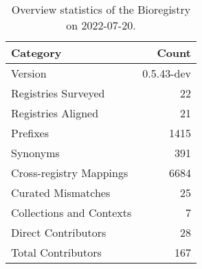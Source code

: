 \begin{table}
\centering
\caption{Overview statistics of the Bioregistry on 2022-07-20.}
\label{tab:bioregistry-summary}
\begin{tabular}{lr}
\toprule
                Category &      Count \\
\midrule
                 Version & 0.5.43-dev \\
     Registries Surveyed &         22 \\
      Registries Aligned &         21 \\
                Prefixes &       1415 \\
                Synonyms &        391 \\
 Cross-registry Mappings &       6684 \\
      Curated Mismatches &         25 \\
Collections and Contexts &          7 \\
     Direct Contributors &         28 \\
      Total Contributors &        167 \\
\bottomrule
\end{tabular}
\end{table}
